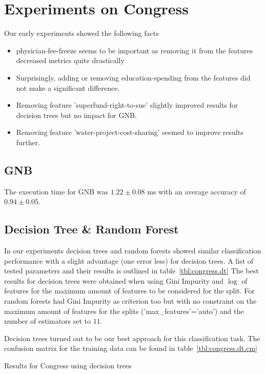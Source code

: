 \section{Experiments on Congress}
Our early experiments showed the following facts
\begin{itemize}
\item physician-fee-freeze seems to be important as removing it from the features decreased metrics quite drastically
\item Surprisingly, adding or removing education-spending from the features did not make a significant difference.
\item Removing feature 'superfund-right-to-sue' slightly improved results for decision trees but no impact for GNB.
\item Removing feature 'water-project-cost-sharing' seemed to improve results further.
\end{itemize}

\subsection{GNB}
The execution time for GNB was $1.22 \pm 0.08$ ms with an average accuracy of $0.94 \pm 0.05$.

\subsection{Decision Tree \& Random Forest}
In our experiments decision trees and random forests showed similar classification performance with a slight advantage (one error less) for decision trees. 
A list of tested parameters and their results is outlined in table~\ref{tbl:congress.dt}
The best results for decision trees were obtained when using Gini Impurity and $\log$ of features for the maximum amount of features to be considered for the split.
For random forests had Gini Impurity as criterion too but with no constraint on the maximum amount of features for the splits ('max\_features'='auto') and the number of estimators set to $11$. 

Decision trees turned out to be our best approach for this classification task. The confusion matrix for the training data can be found in table~\ref{tbl:congress.dt.cm}

\begin{table}[tb]
\centering

\caption{Results for Congress using decision trees}
\label{tbl:congress.dt}
\end{table}

